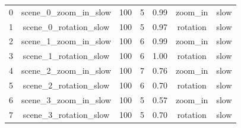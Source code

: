 \begin{table}
\begin{tabular}{|c|c|c|c|c|c|c|}
0  & scene\_0\_zoom\_in\_slow & 100                                                      & 5                                                         & 0.99                                                         & zoom\_in                                                    & slow     \\
1  & scene\_0\_rotation\_slow & 100                                                      & 5                                                         & 0.97                                                         & rotation                                                    & slow     \\
2  & scene\_1\_zoom\_in\_slow & 100                                                      & 6                                                         & 0.99                                                         & zoom\_in                                                    & slow     \\
3  & scene\_1\_rotation\_slow & 100                                                      & 6                                                         & 1.00                                                         & rotation                                                    & slow     \\
4  & scene\_2\_zoom\_in\_slow & 100                                                      & 7                                                         & 0.76                                                         & zoom\_in                                                    & slow     \\
5  & scene\_2\_rotation\_slow & 100                                                      & 6                                                         & 0.70                                                         & rotation                                                    & slow     \\
6  & scene\_3\_zoom\_in\_slow & 100                                                      & 5                                                         & 0.57                                                         & zoom\_in                                                    & slow     \\
7  & scene\_3\_rotation\_slow & 100                                                      & 5                                                         & 0.70                                                         & rotation                                                    & slow     \\

\end{tabular}
\end{table}
